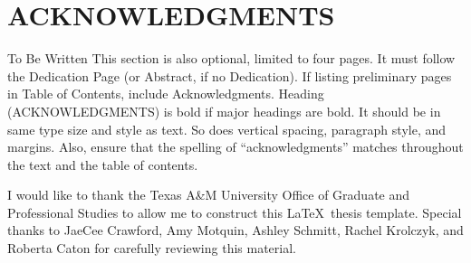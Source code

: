 %
%
%
%


\chapter*{ACKNOWLEDGMENTS}

To Be Written
\indent This section is also optional, limited to four pages. It must follow the Dedication Page (or Abstract, if no Dedication). If listing preliminary pages in Table of Contents, include Acknowledgments. Heading (\MakeUppercase{Acknowledgments}) is bold if major headings are bold. It should be in same type size and style as text. So does vertical spacing, paragraph style, and margins. Also, ensure that the spelling of ``acknowledgments'' matches throughout the text and the table of contents.

I would like to thank the Texas A\&M University Office of Graduate and Professional Studies to allow me to construct this \LaTeX\ thesis template. Special thanks to JaeCee Crawford, Amy Motquin, Ashley Schmitt, Rachel Krolczyk, and Roberta Caton for carefully reviewing this material.  %



\pagebreak{}